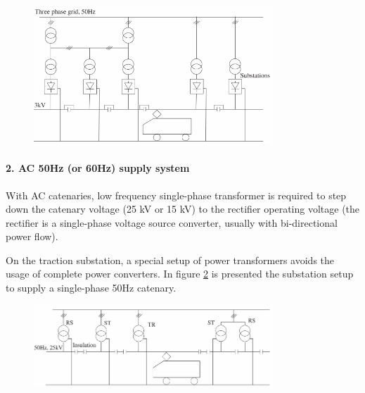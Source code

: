 \begin{figure}[h!]
	\centering
	\begin{minipage}{.6\textwidth}
		\centering
		\includegraphics[width=0.8\textwidth,keepaspectratio]{figures/31.PowerS/abad2016f}
		\label{fig:abad2016f}
	\end{minipage}
\end{figure}




\paragraph{2. AC 50Hz (or 60Hz) supply system\\}

With AC catenaries, low frequency single-phase transformer is required to step down the catenary voltage (25 kV or 15 kV) to the rectifier operating voltage (the rectifier is a single-phase voltage source converter, usually with bi-directional power flow).

On the traction substation, a special setup of power transformers avoids the usage of complete power converters. In figure \ref{fig:abad2016d} is presented the substation setup to supply a single-phase 50Hz catenary.

\begin{figure}[h!]
	\centering
	\begin{minipage}{.6\textwidth}
		\centering
		\includegraphics[width=0.8\textwidth,keepaspectratio]{figures/31.PowerS/abad2016d}
		\label{fig:abad2016d}
	\end{minipage}
\end{figure}


